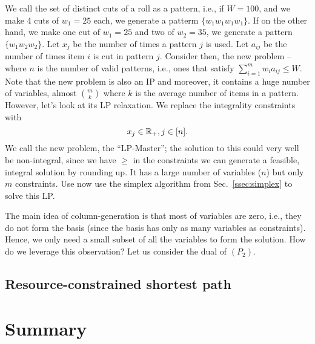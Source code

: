 \documentclass[letterpaper, 10pt, twocolumn, reqno]{amsart}
\begin{document}
We call the set of distinct cuts of a roll as a pattern, i.e., if $W=100$, and we make 4 cuts of $w_1 = 25$ each, we generate a patterm $\{ w_1 w_1 w_1 w_1 \}$. If on the other hand, we make one cut of $w_1 =25$ and two of $w_2 = 35$, we generate a pattern $\{ w_1 w_2 w_2 \}$. Let $x_j$ be the number of times a pattern $j$ is used. Let $a_{ij}$ be the number of times item $i$ is cut in pattern $j$. Consider then, the new problem --
where $n$ is the number of valid patterns, i.e., ones that satisfy $\sum_{i=1}^m w_i a_{ij} \leq W$. Note that the new problem is also an IP and moreover, it contains a huge number of variables, almost $m \choose k$ where $k$ is the average number of items in a pattern. However, let's look at its LP relaxation. We replace the integrality constraints with
$$
x_j \in \mathbb{R}_+, j \in [n].
$$
We call the new problem, the ``LP-Master''; the solution to this could very well be non-integral, since we have $\geq$ in the constraints we can generate a feasible, integral solution by rounding up. It has a large number of variables ($n$) but only $m$ constraints. Use now use the simplex algorithm from Sec.~\ref{ssec:simplex} to solve this LP.

The main idea of column-generation is that most of variables are zero, i.e., they do not form the basis (since the basis has only as many variables as constraints). Hence, we only need a small subset of all the variables to form the solution. How do we leverage this observation? Let us consider the dual of $(P_2)$.



\subsection{Resource-constrained shortest path}
\label{ssec:shortest_path}


\section{Summary}
\label{sec:summary}


{
\small


}
\end{document}
